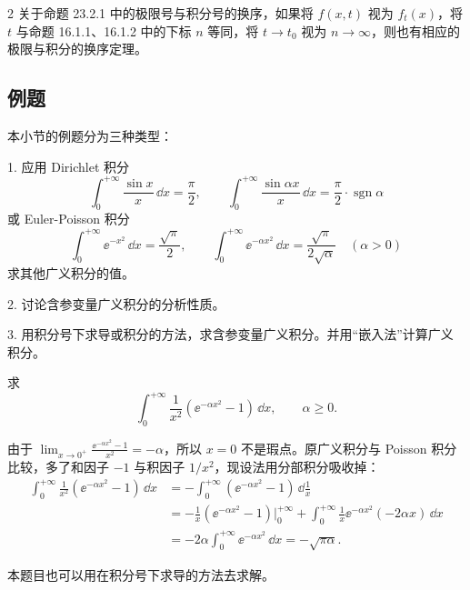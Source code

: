 \begin{xremark}
2 关于命题 23.2.1 中的极限号与积分号的换序，如果将 $f(x,t)$ 视为 $f_t(x)$，将 $t$ 与命题 16.1.1、16.1.2 中的下标 $n$ 等同，将 $t\to t_0$ 视为 $n\to\infty$，则也有相应的极限与积分的换序定理。
\end{xremark}

\subsection{例题}
本小节的例题分为三种类型：

1. 应用 Dirichlet 积分
\[
  \int_0^{+\infty}\frac{\sin x}{x}\,\dd x=\frac\pi2,
  \qquad
  \int_0^{+\infty}\frac{\sin\alpha x}{x}\,\dd x=\frac\pi2\cdot\operatorname{sgn}\alpha
\]
或 Euler-Poisson 积分
\[
  \int_0^{+\infty}\ee^{-x^2}\,\dd x=\frac{\sqrt\pi}{2},
  \qquad
  \int_0^{+\infty}\ee^{-\alpha x^2}\,\dd x=\frac{\sqrt\pi}{2\sqrt\alpha}\quad(\alpha>0)
\]
求其他广义积分的值。

2. 讨论含参变量广义积分的分析性质。

3. 用积分号下求导或积分的方法，求含参变量广义积分。并用“嵌入法”计算广义积分。

\begin{xexample}[23.2.5]
求
\[
  \int_0^{+\infty}\frac1{x^2}(\ee^{-\alpha x^2}-1)\,\dd x,
  \qquad \alpha\geqslant0.
\]
\end{xexample}
\begin{xsolution}
由于 $\displaystyle\lim_{x\to0^+}\frac{\ee^{-\alpha x^2}-1}{x^2}=-\alpha$，所以 $x=0$ 不是瑕点。原广义积分与 Poisson 积分比较，多了和因子 $-1$ 与积因子 $1/x^2$，现设法用分部积分吸收掉：
\[
\begin{aligned}
  \int_0^{+\infty}\frac1{x^2}(\ee^{-\alpha x^2}-1)\,\dd x
  &=-\int_0^{+\infty}(\ee^{-\alpha x^2}-1)\,\dd\frac1x\\
  &=-\frac1x(\ee^{-\alpha x^2}-1)\Big|_0^{+\infty}
    +\int_0^{+\infty}\frac1x\ee^{-\alpha x^2}(-2\alpha x)\,\dd x\\
  &=-2\alpha\int_0^{+\infty}\ee^{-\alpha x^2}\,\dd x=-\sqrt{\pi\alpha}.
\end{aligned}
\]
\end{xsolution}
\begin{xremark}
本题目也可以用在积分号下求导的方法去求解。
\end{xremark}

